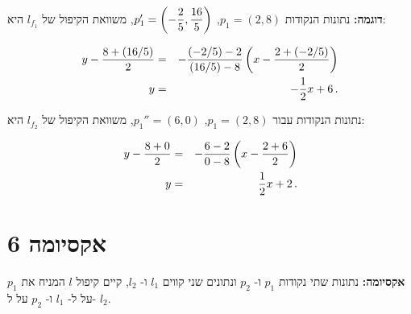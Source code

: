 \textbf{דוגמה:}
נתונות הנקודות
$p_1=(2,8)$,
$p_1'=\left(-\displaystyle\frac{2}{5},\displaystyle\frac{16}{5}\right)$,
משוואת הקיפול של
$l_{f_1}$
היא:

\begin{eqnarray*}
y-\displaystyle\frac{8+(16/5)}{2}&=&-\displaystyle\frac{(-2/5)-2}{(16/5)-8}\left(x-\displaystyle\frac{2+\left(-2/5\right)}{2}\right)\\
y&=&-\displaystyle\frac{1}{2}x+6\,.
\end{eqnarray*}



נתונות הנקודות עבור
$p_1=(2,8)$,
$p_1''=(6,0)$,
משוואת הקיפול של
$l_{f_2}$ 
היא:

\begin{eqnarray*}
y-\displaystyle\frac{8+0}{2}&=&-\displaystyle\frac{6-2}{0-8}\left(x-\displaystyle\frac{2+6}{2}\right)\\
y&=&\displaystyle\frac{1}{2}x+2\,.
\end{eqnarray*}





\section{אקסיומה 6}\label{s.ax6}

\textbf{אקסיומה:}                         
נתונות שתי נקודות
$p_1$
ו-%
$p_2$
ונתונים שני קווים
$l_1$
ו-%
$l_2$,
קיים קיפול
$l$
המניח את 
$p_1$
על ל-%
$l_1$
ו-%
$p_2$
על ל-%
$l_2$.

